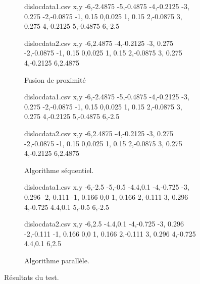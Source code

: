 \documentclass[11pt,class=article,float=false,crop=false]{standalone}
\begin{document}
\begin{figure}[H]
	\centering
	\begin{subfigure}[b]{0.32\textwidth}
		\centering
		\begin{filecontents*}{dislocdata1.csv}
			x,y
			-6,-2.4875
			-5,-0.4875
			-4,-0.2125
			-3, 0.275
			-2,-0.0875
			-1, 0.15
			 0,0.025
			 1, 0.15
			 2,-0.0875
			 3, 0.275
			 4,-0.2125
			 5,-0.4875
			 6,-2.5
		\end{filecontents*}
		\begin{filecontents*}{dislocdata2.csv}
			x,y
			-6,2.4875
			-4,-0.2125
			-3, 0.275
			-2,-0.0875
			-1, 0.15
			 0,0.025
		     1, 0.15
			 2,-0.0875
			 3, 0.275
			 4,-0.2125
			 6,2.4875
		\end{filecontents*}
		\caption{Fusion de proximité}
	\end{subfigure}%
	\begin{subfigure}[b]{0.32\textwidth}
		\centering
		\begin{filecontents*}{dislocdata1.csv}
			x,y
			-6,-2.4875
			-5,-0.4875
			-4,-0.2125
			-3, 0.275
			-2,-0.0875
			-1, 0.15
			0,0.025
			1, 0.15
			2,-0.0875
			3, 0.275
			4,-0.2125
			5,-0.4875
			6,-2.5
		\end{filecontents*}
		\begin{filecontents*}{dislocdata2.csv}
			x,y
			-6,2.4875
			-4,-0.2125
			-3, 0.275
			-2,-0.0875
			-1, 0.15
			0,0.025
			1, 0.15
			2,-0.0875
			3, 0.275
			4,-0.2125
			6,2.4875
		\end{filecontents*}
		\caption{Algorithme séquentiel.}
	\end{subfigure}
	\begin{subfigure}[b]{0.32\textwidth}
		\centering
		\begin{filecontents*}{dislocdata1.csv}
			x,y
			-6,-2.5
			-5,-0.5
			-4.4,0.1
			-4,-0.725
			-3, 0.296
			-2,-0.111
			-1, 0.166
			0,0
			1, 0.166
			2,-0.111
			3, 0.296
			4,-0.725
			4.4,0.1
			5,-0.5
			6,-2.5
		\end{filecontents*}
		\begin{filecontents*}{dislocdata2.csv}
			x,y
			-6,2.5
			-4.4,0.1
			-4,-0.725
			-3, 0.296
			-2,-0.111
			-1, 0.166
			0,0
			1, 0.166
			2,-0.111
			3, 0.296
			4,-0.725
			4.4,0.1
			6,2.5
		\end{filecontents*}
		\caption{Algorithme parallèle.}
	\end{subfigure}
	\caption{Résultats du test.}
	\label{fig:test_frankread_resultats}
\end{figure}
\end{document}
